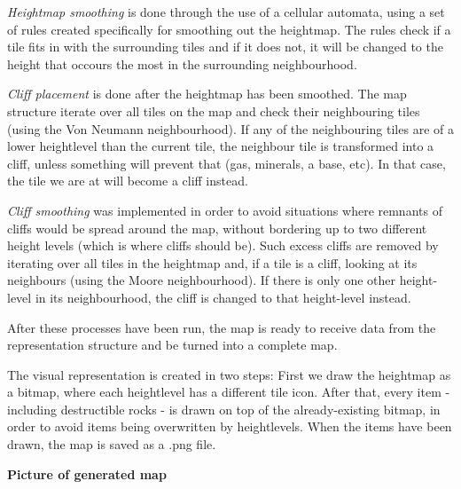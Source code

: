 \textit{Heightmap smoothing} is done through the use of a cellular automata, using a set of rules created specifically for smoothing out the heightmap. The rules check if a tile fits in with the surrounding tiles and if it does not, it will be changed to the height that occours the most in the surrounding neighbourhood.

\textit{Cliff placement} is done after the heightmap has been smoothed. The map structure iterate over all tiles on the map and check their neighbouring tiles (using the Von Neumann neighbourhood). If any of the neighbouring tiles are of a lower heightlevel than the current tile, the neighbour tile is transformed into a cliff, unless something will prevent that (gas, minerals, a base, etc). In that case, the tile we are at will become a cliff instead.

\textit{Cliff smoothing} was implemented in order to avoid situations where remnants of cliffs would be spread around the map, without bordering up to two different height levels (which is where cliffs should be). Such excess cliffs are removed by iterating over all tiles in the heightmap and, if a tile is a cliff, looking at its neighbours (using the Moore neighbourhood). If there is only one other height-level in its neighbourhood, the cliff is changed to that height-level instead.

After these processes have been run, the map is ready to receive data from the representation structure and be turned into a complete map.

The visual representation is created in two steps: First we draw the heightmap as a bitmap, where each heightlevel has a different tile icon. After that, every item - including destructible rocks - is drawn on top of the already-existing bitmap, in order to avoid items being overwritten by heightlevels. When the items have been drawn, the map is saved as a .png file.

\textbf{Picture of generated map}